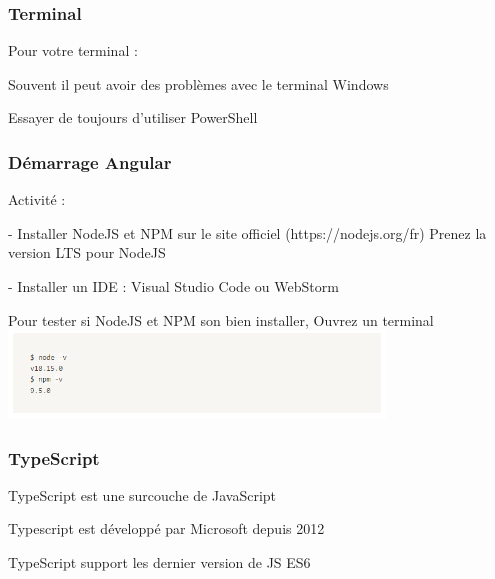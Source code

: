 \documentclass[10pt]{beamer}
\begin{document}
	\begin{frame}
		\frametitle{Terminal}

		Pour votre terminal : \newline \newline

		Souvent il peut avoir des problèmes avec le terminal Windows \newline \newline

		Essayer de toujours d'utiliser PowerShell \newline \newline

	\end{frame}

	\begin{frame}
		\frametitle{Démarrage Angular}

		Activité :  \newline \newline

		- Installer NodeJS et NPM sur le site officiel (https://nodejs.org/fr)
		Prenez la version LTS pour NodeJS  \newline \newline

		- Installer un IDE : Visual Studio Code ou WebStorm  \newline \newline

		Pour tester si NodeJS et NPM son bien installer, Ouvrez un terminal  \newline
		\includegraphics[width=10cm]{assets/npminstall}\newline

	\end{frame}


	\begin{frame}
		\frametitle{TypeScript}

		TypeScript est une surcouche de JavaScript  \newline \newline

		Typescript est développé par Microsoft depuis 2012  \newline \newline

		TypeScript support les dernier version de JS ES6

	\end{frame}
\end{document}
